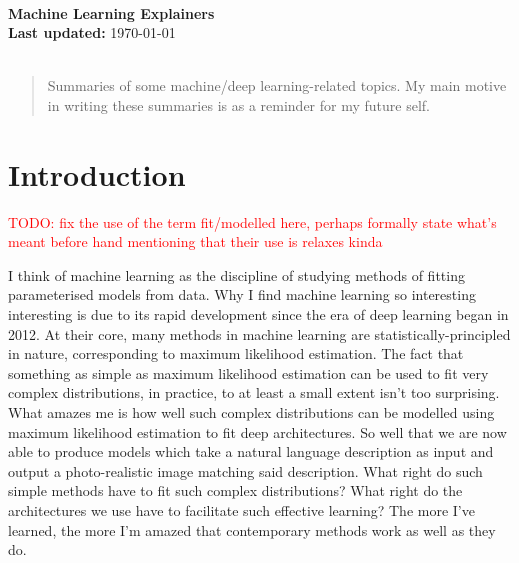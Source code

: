 \documentclass[11pt]{article}
\begin{document}
\begin{center}
\HRule\\[0.6cm]
{\huge\bfseries Machine Learning Explainers}\\[0.2cm]
\textbf{Last updated:} \today\\
\HRule\\[0.6cm]
\end{center}

\begin{abstract}
    \noindent Summaries of some machine/deep learning-related topics. My main motive in writing these summaries is as a reminder for my future self.
\end{abstract}

\setcounter{tocdepth}{2}{\scriptsize\tableofcontents}

\thispagestyle{empty}
\setcounter{page}{0}
\newpage

\section{Introduction}

\textcolor{red}{TODO: fix the use of the term fit/modelled here, perhaps formally state what's meant before hand mentioning that their use is relaxes kinda}

I think of machine learning as the discipline of studying methods of fitting parameterised models from data. Why I find machine learning so interesting interesting is due to its rapid development since the era of deep learning began in 2012. At their core, many methods in machine learning are statistically-principled in nature, corresponding to maximum likelihood estimation. The fact that something as simple as maximum likelihood estimation can be used to fit very complex distributions, in practice, to at least a small extent isn't too surprising. What amazes me is how well such complex distributions can be modelled using maximum likelihood estimation to fit deep architectures. So well that we are now able to produce models which take a natural language description as input and output a photo-realistic image matching said description. What right do such simple methods have to fit such complex distributions? What right do the architectures we use have to facilitate such effective learning? The more I've learned, the more I'm amazed that contemporary methods work as well as they do.
\end{document}
